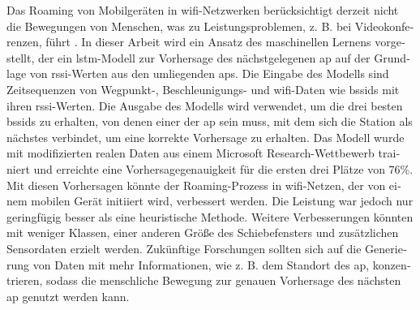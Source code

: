 \null\vfil
\begin{otherlanguage}{ngerman}
\begin{center}\textsf{\textbf{\abstractname}}\end{center}

\noindent
Das Roaming von Mobilgeräten in \ac{wifi}-Netzwerken berücksichtigt derzeit nicht die Bewegungen von Menschen, was zu Leistungsproblemen, z. B. bei Videokonferenzen, führt \cite{handoff_performance_issues}.
In dieser Arbeit wird ein Ansatz des maschinellen Lernens vorgestellt, der ein \ac{lstm}-Modell zur Vorhersage des nächstgelegenen \ac{ap} auf der Grundlage von \ac{rssi}-Werten aus den umliegenden \acp{ap}.
Die Eingabe des Modells sind Zeitsequenzen von Wegpunkt-, Beschleunigungs- und \ac{wifi}-Daten wie \acp{bssid} mit ihren \ac{rssi}-Werten.
Die Ausgabe des Modells wird verwendet, um die drei besten \acp{bssid} zu erhalten, von denen einer der \ac{ap} sein muss, mit dem sich die Station als nächstes verbindet, um eine korrekte Vorhersage zu erhalten.
Das Modell wurde mit modifizierten realen Daten aus einem Microsoft Research-Wettbewerb trainiert und erreichte eine Vorhersagegenauigkeit für die ersten drei Plätze von 76\%.
Mit diesen Vorhersagen könnte der Roaming-Prozess in \ac{wifi}-Netzen, der von einem mobilen Gerät initiiert wird, verbessert werden.
Die Leistung war jedoch nur geringfügig besser als eine heuristische Methode.
Weitere Verbesserungen könnten mit weniger Klassen, einer anderen Größe des Schiebefensters und zusätzlichen Sensordaten erzielt werden.
Zukünftige Forschungen sollten sich auf die Generierung von Daten mit mehr Informationen, wie z. B. dem Standort des \ac{ap}, konzentrieren, sodass die menschliche Bewegung zur genauen Vorhersage des nächsten \ac{ap} genutzt werden kann.
\end{otherlanguage}
\vfil\null
